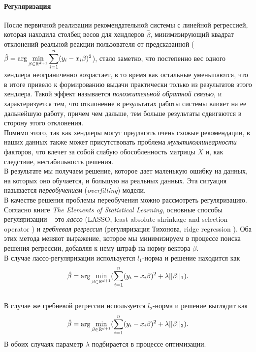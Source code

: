\documentclass[12pt]{article}
\begin{document}
\paragraph{Регуляризация}
\indent После первичной реализации рекомендательной системы с линейной регрессией, которая находила столбец весов для хендлеров $\hat\beta$, минимизирующий квадрат отклонений реальной реакции пользователя от предсказанной ($\displaystyle \hat\beta = {\rm arg}\min_{\beta\in\mathbb{R}^{d+1}} \sum_{i=1}^n (y_i - x_i \beta)^2$), стало заметно, что постепенно вес одного хендлера неограниченно возрастает, в то время как остальные уменьшаются, что в итоге привело к формированию выдачи практически только из результатов этого хендлера. Такой эффект называется \textit{положительной обратной связью}, и характеризуется тем, что отклонение в результатах работы системы влияет на ее дальнейшую работу, причем чем дальше, тем больше результаты сдвигаются в сторону этого отклонения.
\\\indent Помимо этого, так как хендлеры могут предлагать очень схожые рекомендации, в наших данных также может присутствовать проблема \textit{мультиколлинеарности} факторов, что влечет за собой слабую обособленность матрицы $X$ и, как следствие, нестабильность решения.
\\\indent В результате мы получаем решение, которое дает маленькую ошибку на данных, на которых оно обучается, и большую на реальных данных. Эта ситуация называется \textit{переобучением} (\textit{overfitting}) модели.
\\\indent В качестве решения проблемы переобучения можно рассмотреть регуляризацию. Согласно книге \textit{The Elements of Statistical Learning}\cite{hastie2001elements}, основные способы регуляризации -- это \textit{лассо} (LASSO, least absolute shrinkage and selection operator \cite{lasso}) и \textit{гребневая регрессия} (регуляризация Тихонова, ridge regression \cite{ridge}). Оба этих метода меняют выражение, которое мы минимизируем в процессе поиска решения регрессии, добавляя к нему штраф на норму вектора $\beta$. 
\\\indent В случае лассо-регуляризации используется $l_1$-норма и решение находится как $$\displaystyle \hat\beta = {\rm arg}\min_{\beta\in\mathbb{R}^{d+1}}( \sum_{i=1}^n (y_i - x_i \beta)^2 + \lambda ||\beta||_1).$$
\\\indent В случае же гребневой регрессии используется $l_2$-норма и решение выглядит как $$\displaystyle \hat\beta = {\rm arg}\min_{\beta\in\mathbb{R}^{d+1}}( \sum_{i=1}^n (y_i - x_i \beta)^2 + \lambda ||\beta||_2).$$ В обоих случаях параметр $\lambda$ подбирается в процессе оптимизации.
\end{document}
